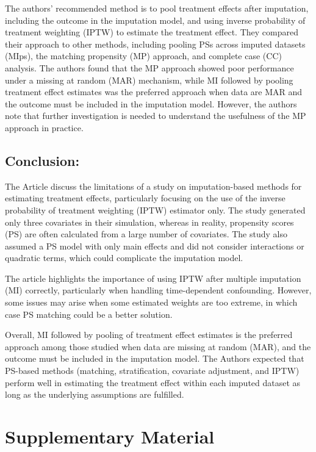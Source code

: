 \documentclass{article}
\begin{document}
The authors' recommended method is to pool treatment effects after
imputation, including the outcome in the imputation model, and using
inverse probability of treatment weighting (IPTW) to estimate the
treatment effect. They compared their approach to other methods,
including pooling PSs across imputed datasets (MIps), the matching
propensity (MP) approach, and complete case (CC) analysis. The authors
found that the MP approach showed poor performance under a missing at
random (MAR) mechanism, while MI followed by pooling treatment effect
estimates was the preferred approach when data are MAR and the outcome
must be included in the imputation model. However, the authors note that
further investigation is needed to understand the usefulness of the MP
approach in practice.

\hypertarget{conclusion-1}{%
\subsection{Conclusion:}\label{conclusion-1}}

The Article discuss the limitations of a study on imputation-based
methods for estimating treatment effects, particularly focusing on the
use of the inverse probability of treatment weighting (IPTW) estimator
only. The study generated only three covariates in their simulation,
whereas in reality, propensity scores (PS) are often calculated from a
large number of covariates. The study also assumed a PS model with only
main effects and did not consider interactions or quadratic terms, which
could complicate the imputation model.

The article highlights the importance of using IPTW after multiple
imputation (MI) correctly, particularly when handling time-dependent
confounding. However, some issues may arise when some estimated weights
are too extreme, in which case PS matching could be a better solution.

Overall, MI followed by pooling of treatment effect estimates is the
preferred approach among those studied when data are missing at random
(MAR), and the outcome must be included in the imputation model. The
Authors expected that PS-based methods (matching, stratification,
covariate adjustment, and IPTW) perform well in estimating the treatment
effect within each imputed dataset as long as the underlying assumptions
are fulfilled.

\hypertarget{supplementary-material}{%
\section*{Supplementary Material}\label{supplementary-material}}
\end{document}
